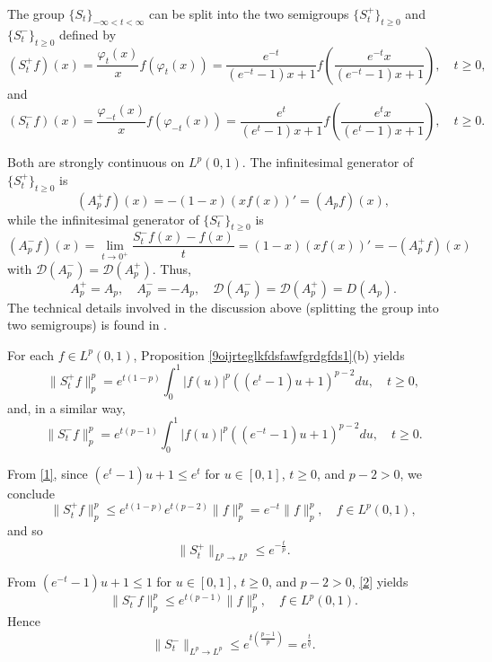 \documentclass[11pt]{amsart}
\numberwithin{equation}{section}
\theoremstyle{plain}
\theoremstyle{definition}
\renewcommand{\leq}{\leqslant}
\renewcommand{\geq}{\geqslant}
\newcommand{\0}{{\color{lightgray}0}}
\begin{document}
The group $\{S_t\}_{-\infty < t < \infty}$ can be split into the two semigroups $\{S_t^+\}_{t\geq 0}$ and  $\{S_t^-\}_{t\geq 0}$  defined by 
$$
(S_t^+ f) (x) = \frac{\varphi_t(x)}{x} f(\varphi_t(x))=\frac{e^{-t} }{(e^{-t}-1)x+1} f\left( \frac{e^{-t} x}{(e^{-t}-1)x+1} \right),
 \quad t \geq 0, 
$$ 
and 
$$
(S_t^- f) (x) = \frac{\varphi_{-t}(x)}{x} f(\varphi_{-t}(x)) = 
\frac{e^t }{(e^{t}-1)x+1} f\left( \frac{e^t x}{(e^{t}-1)x+1} \right), \quad t \geq 0.
$$

Both are strongly continuous on $L^p(0,1)$. The infinitesimal generator of $\{S_t^+\}_{t \geq 0}$ is
$$
(A_{p}^+ f) (x) = -(1-x)(xf(x))'=(A_{p} f)(x), 
$$
while the infinitesimal generator of $\{S_t^-\}_{t \geq 0}$ is
$$
(A_{p}^- f)(x) = \lim_{t \to 0^{+}} \frac{S_t^- f (x) - f(x)}{t} =  (1-x)(xf(x))' = -(A_p^+ f) (x)
$$
with $\mathcal{D}(A_{p}^-) = \mathcal{D}(A_{p}^+)$. Thus, 
\begin{equation}\label{AAAAApppp}
A_{p}^+ = A_{p}, \quad A_{p}^- = -A_{p}, \quad \mathcal{D}(A_{p}^-) = \mathcal{D}(A_{p}^+)=D(A_{p}).
\end{equation}
The technical details involved in the discussion above (splitting the group into two semigroups) is found in  \cite[Sec.~1.6]{MR710486}.

For each $f \in L^p(0, 1)$, Proposition \ref{9oijrteglkfdsfawfgrdgfds1}(b) yields
\begin{equation}\label{1}
 \|S_t^+ f\|_p^p = e^{t(1-p)} \int_0^1 |f(u)|^p ( (e^t-1)u + 1 )^{p-2} du, \quad t \geq 0,
 \end{equation}
and, in a similar way,
\begin{equation}\label{2}
\|S_t^- f\|_p^p = e^{t(p-1)} \int_0^1 |f(u)|^p ( (e^{-t}-1)u + 1 )^{p-2} du, \quad t \geq 0. 
\end{equation}

From \eqref{1}, since $(e^t-1)u+1 \leq e^t$ for $u\in [0,1]$, $t \geq 0$, and $p-2>0$, we conclude
$$
\|S_t^+ f\|_p^p \leq e^{t(1-p)} e^{t(p-2)} \|f\|_p^p= e^{-t} \|f\|_p^p, \quad f \in L^p(0, 1),
$$
and so 
\begin{equation}\label{3}
\|S_t^+\|_{L^p \to L^p} \leq e^{-\frac{t}{p}}.
\end{equation}

From  $(e^{-t}-1)u+1 \leq 1$ for  $u \in [0,1]$, $t \geq 0$, and $p-2>0$,  \eqref{2} yields
$$
\|S_t^- f\|_p^p \leq e^{t(p-1)} \|f\|_p^p, \quad f \in L^p(0, 1).
$$
Hence
\begin{equation}\label{4} 
\|S_t^-\|_{L^p \to L^p} \leq e^{t(\frac{p-1}{p})} = e^{\frac{t}{q}}.
\end{equation}
\end{document}
